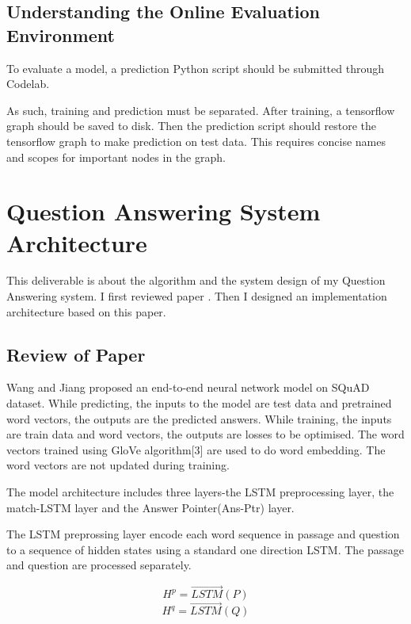 \documentclass[12pt]{article}
\begin{document}
\subsection{Understanding the Online Evaluation Environment}


To evaluate a model, a prediction Python script should be submitted through Codelab.

As such, training and prediction must be separated. After training, a tensorflow graph should be saved to disk. Then the prediction script should restore the tensorflow graph to make prediction on test data. This requires concise names and scopes for important nodes in the graph.




\break

\section{Question Answering System Architecture}\label{sec:implementpaper}

This deliverable is about the algorithm and the system design of my Question Answering system. I first reviewed paper \cite{wang2016machine}. Then I designed an implementation architecture based on this paper.

\subsection{Review of Paper \cite{wang2016machine}}\label{theoreticalModel}

Wang and Jiang proposed an end-to-end neural network model on SQuAD dataset. While predicting, the inputs to the model are test data and pretrained word vectors, the outputs are the predicted answers. While training, the inputs are train data and word vectors, the outputs are losses to be optimised. The word vectors trained using GloVe algorithm[3] are used to do word embedding. The word vectors are not updated during training.

The model architecture includes three layers-the LSTM preprocessing layer, the match-LSTM layer and the Answer Pointer(Ans-Ptr) layer.

The LSTM preprossing layer encode each word sequence in passage and question to a sequence of hidden states using a standard one direction LSTM. The passage and question are processed separately.

$$H^p = \overrightarrow{LSTM}(P)$$
$$H^q = \overrightarrow{LSTM}(Q)$$
\end{document}

